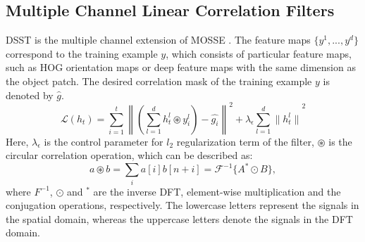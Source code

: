 \documentclass[journal]{IEEEtran}
\begin{document}
\subsection{Multiple Channel Linear Correlation Filters}
\label{secDSST}
DSST \cite{DSST} is the multiple channel extension of MOSSE \cite{MOSSE}. The feature maps $\{y^1, ...,y^d\}$ correspond to the training example $y$, which consists of particular feature maps, such as HOG orientation maps or deep feature maps with the same dimension as the object patch. The desired correlation mask of the training example $y$ is denoted by $\hat{g}$.
\begin{equation}
	\label{eqDSST}
	\mathcal{L}(h_t) =  {\sum\limits_{i=1}^t\left\lVert(\sum\limits_{l=1}^d h_t^l\circledast y_i^l)-\hat{g_i}\right\rVert}^2 + \lambda_\epsilon{\sum\limits_{l=1}^d \lVert h_t^l\rVert}^2
\end{equation}
Here, $\lambda_\epsilon$ is the control parameter for $l_2$ regularization term of the filter, $\circledast$ is the circular correlation operation, which can be described as:
\begin{equation}
\label{eqCorrTheorem}
a \circledast b = \sum\limits_{i} a[i]b[n+i]=\mathcal{F}^{-1}\{A^* \odot B\},
\end{equation}
where ${F}^{-1}$, $\odot$ and $^*$ are the inverse DFT, element-wise multiplication and the conjugation operations, respectively. The lowercase letters represent the signals in the spatial domain, whereas the uppercase letters denote the signals in the DFT domain.
\end{document}
